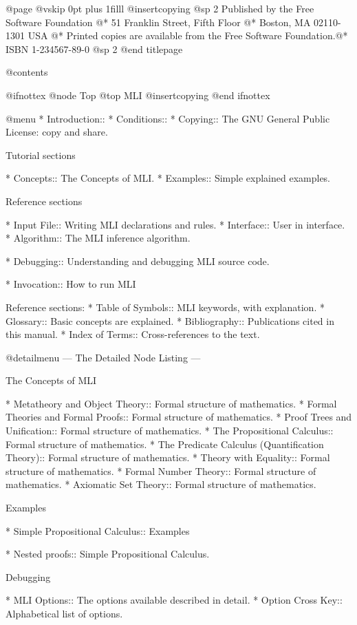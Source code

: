 @page
@vskip 0pt plus 1filll
@insertcopying
@sp 2
Published by the Free Software Foundation @*
51 Franklin Street, Fifth Floor @*
Boston, MA  02110-1301  USA @*
Printed copies are available from the Free Software Foundation.@*
ISBN 1-234567-89-0
@sp 2
@end titlepage

@contents

@ifnottex
@node Top
@top MLI
@insertcopying
@end ifnottex

@menu
* Introduction::
* Conditions::
* Copying::         The GNU General Public License: copy and share.


Tutorial sections

* Concepts::      The Concepts of MLI.
* Examples::      Simple explained examples.

Reference sections

* Input File::    Writing MLI declarations and rules.
* Interface::     User in interface.
* Algorithm::     The MLI inference algorithm.

* Debugging::     Understanding and debugging MLI source code.

* Invocation::    How to run MLI


Reference sections:
* Table of Symbols::    MLI keywords, with explanation.
* Glossary::            Basic concepts are explained.
* Bibliography::        Publications cited in this manual.
* Index of Terms::      Cross-references to the text.


@detailmenu
 --- The Detailed Node Listing ---

The Concepts of MLI

* Metatheory and Object Theory:: Formal structure of mathematics.
* Formal Theories and Formal Proofs:: Formal structure of mathematics.
* Proof Trees and Unification:: Formal structure of mathematics.
* The Propositional Calculus:: Formal structure of mathematics.
* The Predicate Calculus (Quantification Theory):: Formal structure of mathematics.
* Theory with Equality:: Formal structure of mathematics.
* Formal Number Theory:: Formal structure of mathematics.
* Axiomatic Set Theory:: Formal structure of mathematics.

Examples

* Simple Propositional Calculus:: Examples

* Nested proofs::   Simple Propositional Calculus.


Debugging

* MLI Options::       The options available described in detail.
* Option Cross Key::  Alphabetical list of options.



